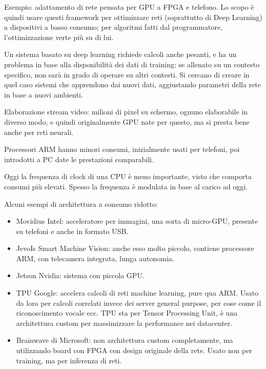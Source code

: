 \documentclass[a4paper,oneside]{book}
\begin{document}
    Esempio: adattamento di rete pensata per GPU a FPGA e telefono. Lo scopo è quindi
    usare questi framework per ottimizzare reti (soprattutto di Deep Learning) a 
    dispositivi a basso consumo; per algoritmi fatti dal programmatore, l'ottimizzazione 
    verte più su di lui.

    Un sistema basato su deep learning richiede calcoli anche pesanti, e ha un problema in 
    base alla disponibilità dei dati di training: se allenato su un contesto specifico, non 
    sarà in grado di operare su altri contesti. Si cercano di creare in quel caso sistemi che 
    apprendono dai nuovi dati, aggiustando parametri della rete in base a nuovi ambienti.

    Elaborazione stream video: milioni di pixel su schermo, ognuno elaborabile in diverso modo, 
    e quindi originalmente GPU nate per questo, ma si presta bene anche per reti neurali.

    Processori ARM hanno minori consumi, inizialmente usati per telefoni, poi introdotti 
    a PC date le prestazioni comparabili.

    Oggi la frequenza di clock di una CPU è meno importante, visto che comporta consumi più 
    elevati. Spesso la frequenza è modulata in base al carico ad oggi.

    Alcuni esempi di architettura a consumo ridotto:

    \begin{itemize}
        \item Movidius Intel: acceleratore per immagini, una sorta di micro-GPU, presente su telefoni 
        e anche in formato USB.
    
        \item JevoIs Smart Machine Vision: anche esso molto piccolo, contiene processore ARM, con 
        telecamera integrata, lunga autonomia. 
    
        \item Jetson Nvidia: sistema con piccola GPU.
    
        \item TPU Google: accelera calcoli di reti machine learning, pure qua ARM. Usato da loro per calcoli 
        correlati invece dei server general purpose, per cose come il riconoscimento vocale ecc.
        TPU sta per Tensor Processing Unit, è una architettura custom per massimizzare la performance 
        nei datacenter.
    
        \item Brainwave di Microsoft: non architettura custom completamente, ma utilizzando board con FPGA 
        con design originale della rete. Usato non per training, ma per inferenza di reti.
    \end{itemize}
\end{document}
